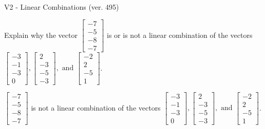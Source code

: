 \begin{exercise}
  \begin{exerciseTitle}V2 - Linear Combinations (ver. 495)\end{exerciseTitle}
  \begin{exerciseStatement}
    Explain why the vector \(\left[\begin{array}{c}
-7 \\
-5 \\
-8 \\
-7
\end{array}\right]\)  is or is not a linear 
	combination of the vectors \(\left[\begin{array}{c}
-3 \\
-1 \\
-3 \\
0
\end{array}\right] , \left[\begin{array}{c}
2 \\
-3 \\
-5 \\
-3
\end{array}\right] , \text{ and } \left[\begin{array}{c}
-2 \\
2 \\
-5 \\
1
\end{array}\right]\).
	


  \end{exerciseStatement}
  \begin{exerciseAnswer}
   \(\left[\begin{array}{c}
-7 \\
-5 \\
-8 \\
-7
\end{array}\right]\) 
  	 is not  
	a linear combination of the vectors \(\left[\begin{array}{c}
-3 \\
-1 \\
-3 \\
0
\end{array}\right] , \left[\begin{array}{c}
2 \\
-3 \\
-5 \\
-3
\end{array}\right] , \text{ and } \left[\begin{array}{c}
-2 \\
2 \\
-5 \\
1
\end{array}\right]\).

	
  


  \end{exerciseAnswer}
\end{exercise}